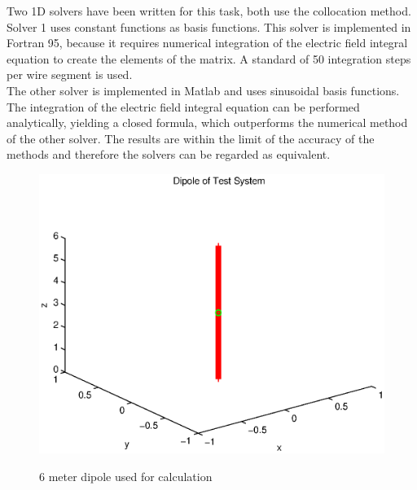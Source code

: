 \documentclass[a4paper,11pt]{article}
\begin{document}
Two 1D solvers have been written for this task, both use the collocation method. Solver 1 uses constant functions as basis functions. This solver is implemented in Fortran 95, because it requires numerical integration of the electric field integral equation to create the elements of the matrix. A standard of 50 integration steps per wire segment is used.\\

The other solver is implemented in Matlab and uses sinusoidal basis functions. The integration of the electric field integral equation can be performed analytically, yielding a closed formula, which outperforms the numerical method of the other solver. The results are within the limit of the accuracy of the methods and therefore the solvers can be regarded as equivalent.\\



\begin{figure}
  \includegraphics[width=12cm]{dipol}\\
  \caption{6 meter dipole used for calculation}\label{figDipol}
\end{figure}
\end{document}
